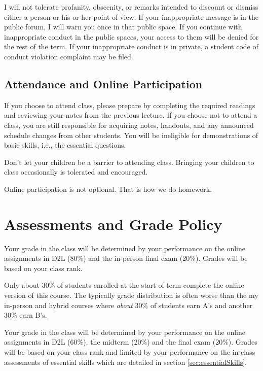 \documentclass[letterpaper,10pt]{article}
\newif\ifonline
\begin{document}
I will not tolerate profanity, obscenity, or remarks intended to
discount or dismiss either a person or his or her point of view. If your inappropriate message is in the public forum, I will warn you
once in that public space. If you continue with inappropriate conduct
in the public spaces, your access to them will be denied for the rest
of the term. If your inappropriate
conduct is in private, a student code of conduct violation complaint
may be filed.

\ifonline

\else
   \subsection{Attendance and Online Participation}
   
   If you choose to attend class, please prepare by completing the required readings and reviewing your notes from the previous lecture. If you choose not to attend a class, you are still responsible for acquiring notes, handouts, and any announced schedule changes from other students. You will be ineligible for demonstrations of basic skills, i.e., the essential questions. 
   
   Don’t let your children be a barrier to attending class. Bringing your children to class occasionally is tolerated and encouraged.
  
  Online participation is not optional. That is how we do homework.

\fi

\section{Assessments and Grade Policy}

\ifonline
  Your grade in the class will be determined by your performance on the online assignments in D2L (80\%) and the in-person final exam (20\%).  Grades will be based on your class rank.

  Only about 30\% of students enrolled at the start of term complete the online version of this course.  The typically grade distribution is often worse than the my in-person and hybrid courses where \emph{about} 30\% of students earn A's and another 30\% earn B's.

\else
  Your grade in the class will be determined by your performance on the online assignments in D2L (60\%), the midterm (20\%) and the final exam (20\%).  Grades will be based on your class rank and limited by your performance on the in-class assessments of essential skills which are detailed in section \ref{sec:essentialSkills}. 
  
\end{document}
